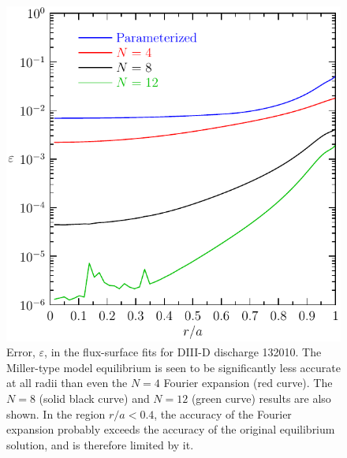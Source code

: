 \begin{figure}
\begin{center}
\includegraphics[scale=0.8]{figures/error.pdf}
\caption{Error, $\varepsilon$, in the flux-surface 
fits for DIII-D discharge 132010.  The Miller-type 
model equilibrium is seen to be significantly less 
accurate at all radii than even the $N=4$ Fourier 
expansion (red curve).  The 
$N=8$ (solid black curve) and $N=12$ (green curve) 
results are also 
shown.  In the region $r/a < 0.4$, the accuracy of
the Fourier expansion probably exceeds the accuracy 
of the original equilibrium solution, and is therefore 
limited by it.}
\label{fig.error}
\end{center}
\end{figure}
%
